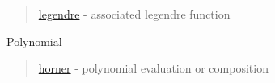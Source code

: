 \begin{quote}
\noindent
\hyperlink{legendre}{legendre} - associated legendre function\\
\end{quote}

Polynomial 

\begin{quote}
\noindent
\hyperlink{horner}{horner} - polynomial evaluation or composition \\
\end{quote}




 
 
 
 
 
 



